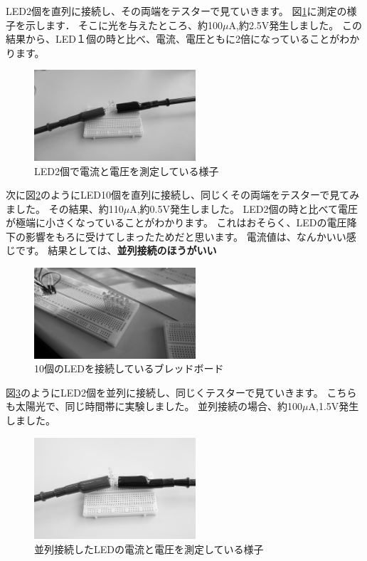 LED2個を直列に接続し、その両端をテスターで見ていきます。
図\ref{fig:led2}に測定の様子を示します．
そこに光を与えたところ、約100$\mu\si\ampere$,約2.5$\si\volt$発生しました。
この結果から、LED１個の時と比べ、電流、電圧ともに2倍になっていることがわかります。

\begin{figure}[htbp]
    \centering
    \includegraphics[width=60mm]{./assets/mouse/gray/12.JPG}
    \caption{LED2個で電流と電圧を測定している様子}
    \label{fig:led2}
\end{figure}

次に図\ref{fig:led10}のようにLED10個を直列に接続し、同じくその両端をテスターで見てみました。
その結果、約110$\mu\si\ampere$,約0.5$\si\volt$発生しました。
LED2個の時と比べて電圧が極端に小さくなっていることがわかります。
これはおそらく、LEDの電圧降下の影響をもろに受けてしまったためだと思います。
電流値は、なんかいい感じです。
結果としては、{\bf 並列接続のほうがいい}


\begin{figure}[htbp]
    \centering
    \includegraphics[width=60mm]{./assets/mouse/gray/4.JPG}
    \caption{10個のLEDを接続しているブレッドボード}
    \label{fig:led10}
\end{figure}

図\ref{fig:led_par}のようにLED2個を並列に接続し、同じくテスターで見ていきます。
こちらも太陽光で、同じ時間帯に実験しました。
並列接続の場合、約100$\mu\si\ampere$,1.5$\si\volt$発生しました。


\begin{figure}[htbp]
    \centering
    \includegraphics[width=60mm]{./assets/mouse/gray/13.JPG}
    \caption{並列接続したLEDの電流と電圧を測定している様子}
    \label{fig:led_par}
\end{figure}


